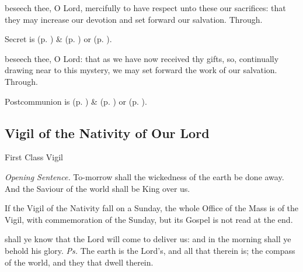 
\secret
{} beseech thee, O Lord, mercifully to have respect unto these our sacrifices: that they may increase our devotion and set forward our salvation. Through.
\begin{rubric}
     Secret is  (p. \pageref{SPMaryInAdvent}) \&   (p. \pageref{SPAgainst}) or  (p. \pageref{SPChiefBishop}).
\end{rubric}

\postcommunion
{} beseech thee, O Lord: that as we have now received thy gifts, so, continually drawing near to this mystery, we may set forward the work of our salvation. Through.
\begin{rubric}
     Postcommunion is  (p. \pageref{SPMaryInAdvent}) \&   (p. \pageref{SPAgainst}) or  (p. \pageref{SPChiefBishop}).
\end{rubric}

\subsection{Vigil of the Nativity of Our Lord}
\begin{inhead}
{First Class Vigil}
\end{inhead}
\par\noindent
\textit{Opening Sentence.} To-morrow shall the wickedness of the earth be done away. And the Saviour of the world shall be King over us.\par

\begin{rubric}
    If the Vigil of the Nativity fall on a Sunday, the whole Office of the Mass is of the Vigil, with commemoration of the Sunday, but its Gospel is not read at the end.
\end{rubric}

\introit
{} shall ye know that the Lord will come to deliver us: and in the morning shall ye behold his glory. \textit{Ps.} The earth is the Lord's, and all that therein is; the compass of the world, and they that dwell therein.

